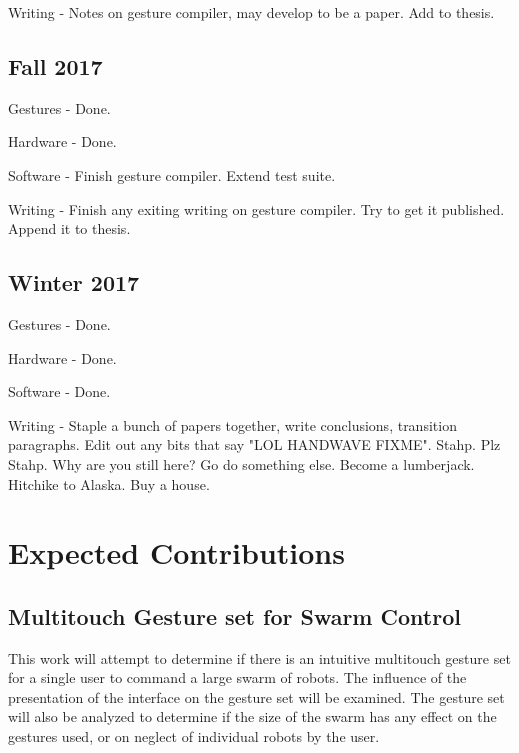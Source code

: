 \documentclass[]{article}
\begin{document}
Writing - Notes on gesture compiler, may develop to be a paper. Add to thesis. 

\subsection{Fall 2017}

Gestures - Done. 

Hardware - Done. 

Software - Finish gesture compiler. Extend test suite. 

Writing - Finish any exiting writing on gesture compiler. Try to get it published. Append it to thesis. 

\subsection{Winter 2017}

Gestures - Done. 

Hardware - Done. 

Software - Done. 

Writing - Staple a bunch of papers together, write conclusions, transition paragraphs. Edit out any bits that say "LOL HANDWAVE FIXME". Stahp. Plz Stahp. Why are you still here? Go do something else. Become a lumberjack. Hitchike to Alaska. Buy a house. 

\section{Expected Contributions}

\subsection{Multitouch Gesture set for Swarm Control}
This work will attempt to determine if there is an intuitive multitouch gesture set for a single user to command a large swarm of robots.
The influence of the presentation of the interface on the gesture set will be examined. 
The gesture set will also be analyzed to determine if the size of the swarm has any effect on the gestures used, or on neglect of individual robots by the user. 
\end{document}
